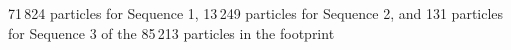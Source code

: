 71\,824 particles for Sequence 1, 13\,249 particles for Sequence 2, and 131 particles for Sequence 3 of the 85\,213 particles in the footprint%
